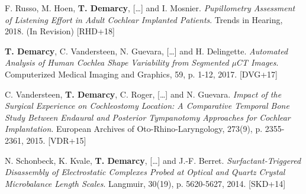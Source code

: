\begin{cvhonors}
  \cvhonor
    {F. Russo, M. Hoen, \textbf{T. Demarcy}, [\ldots] and I. Mosnier.  \textit{Pupillometry Assessment of Listening Effort in Adult Cochlear Implanted Patients}. Trends in Hearing, 2018. (In Revision)} %
    {\hypertarget{RHD+18}{[RHD+18]}} %

  \cvhonor
    {\textbf{T. Demarcy}, C. Vandersteen, N. Guevara, [\ldots] and H. Delingette.  \textit{Automated Analysis of Human Cochlea Shape Variability from Segmented µCT Images}. Computerized Medical Imaging and Graphics, 59, p. 1-12, 2017.} %
    {\hypertarget{DVG+17}{[DVG+17]}} %
    
  \cvhonor
    {C.  Vandersteen,  \textbf{T. Demarcy},  C.  Roger,  [\ldots]  and  N. Guevara. \textit{Impact of the Surgical Experience on Cochleostomy Location: A Comparative Temporal Bone Study Between Endaural and Posterior Tympanotomy Approaches for Cochlear Implantation}. European Archives of Oto-Rhino-Laryngology, 273(9), p. 2355-2361, 2015.} %
    {\hypertarget{VDR+15}{[VDR+15]}} %
       
  \cvhonor
    {N.  Schonbeck,  K.  Kvale,  \textbf{T.  Demarcy}, [\ldots] and  J.-F.  Berret.   \textit{Surfactant-Triggered  Disassembly of  Electrostatic  Complexes  Probed  at  Optical  and  Quartz  Crystal Microbalance Length Scales}. Langmuir, 30(19), p. 5620-5627, 2014.} %
    {\hypertarget{SKD+14}{[SKD+14]}} %

\end{cvhonors}
\pagebreak



